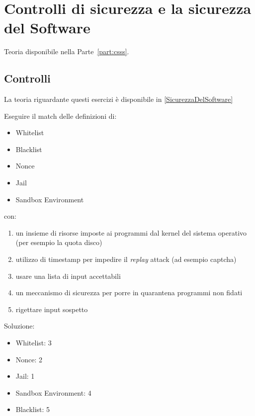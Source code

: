 \chapter{Controlli di sicurezza e la sicurezza del Software}
Teoria disponibile nella Parte~\ref{part:csss}.
\section{Controlli}
\label{es:Controlli}

La teoria riguardante questi esercizi è disponibile in \ref{SicurezzaDelSoftware}

\begin{Exercise} [
  title={Associa i termini},
  label={esControlli1}
  ]

  \Question Eseguire il match delle definizioni di:
\begin{itemize}
\item Whitelist
\item Blacklist
\item Nonce
\item Jail
\item Sandbox Environment
\end{itemize}
con:
\begin{enumerate}
 \item un insieme di risorse imposte ai programmi dal kernel del sistema
operativo (per esempio la quota disco)
 \item utilizzo di timestamp per impedire il \textit{replay} attack (ad esempio
captcha)
 \item usare una lista di input accettabili
 \item un meccanismo di sicurezza per porre in quarantena programmi non fidati
 \item rigettare input sospetto
\end{enumerate}

\end{Exercise}

\begin{Answer} [
  ref={esControlli1},
  number={1}
  ]

  \Question Soluzione:
\begin{itemize}
\item Whitelist: 3
\item Nonce: 2
\item Jail: 1
\item Sandbox Environment: 4
\item Blacklist: 5

\end{itemize}

\end{Answer}



